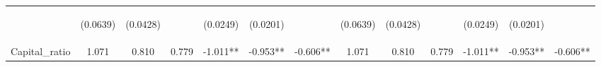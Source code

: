 \documentclass[]{article}
\begin{document}
\begin{center}
\begin{tabular}{lcccccccccccc}
\vspace{4pt} & \begin{footnotesize}(0.0639)\end{footnotesize} & \begin{footnotesize}(0.0428)\end{footnotesize} & \begin{footnotesize}\end{footnotesize} & \begin{footnotesize}(0.0249)\end{footnotesize} & \begin{footnotesize}(0.0201)\end{footnotesize} & \begin{footnotesize}\end{footnotesize} & \begin{footnotesize}(0.0639)\end{footnotesize} & \begin{footnotesize}(0.0428)\end{footnotesize} & \begin{footnotesize}\end{footnotesize} & \begin{footnotesize}(0.0249)\end{footnotesize} & \begin{footnotesize}(0.0201)\end{footnotesize} & \begin{footnotesize}\end{footnotesize} \\
Capital\_ratio & 1.071 & 0.810 & 0.779 & -1.011** & -0.953** & -0.606** & 1.071 & 0.810 & 0.779 & -1.011** & -0.953** & -0.606** \\

\end{tabular}
\end{center}
\end{document}
